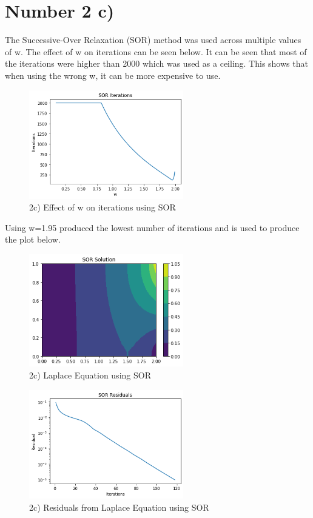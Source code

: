\documentclass{article}
\begin{document}
	\section*{Number 2 c)}
		The Successive-Over Relaxation (SOR) method was used across multiple values of w. The effect of w on iterations can be seen below. It can be seen that most of the iterations were higher than 2000 which was used as a ceiling. This shows that when using the wrong w, it can be more expensive to use.
		
		\begin{figure}[H]
			\centering
			\includegraphics[width=0.6\textwidth]{images/sorite.png}
			\caption{\label{} 2c) Effect of w on iterations using SOR }
		\end{figure}
		
		Using w=1.95 produced the lowest number of iterations and is used to produce the plot below.
		
		\begin{figure}[H]
			\centering
			\includegraphics[width=0.6\textwidth]{images/sor.png}
			\caption{\label{} 2c) Laplace Equation using SOR }
		\end{figure}
		
		\begin{figure}[H]
			\centering
			\includegraphics[width=0.6\textwidth]{images/sorres.png}
			\caption{\label{} 2c) Residuals from Laplace Equation using SOR }
		\end{figure}
		 
\end{document}

